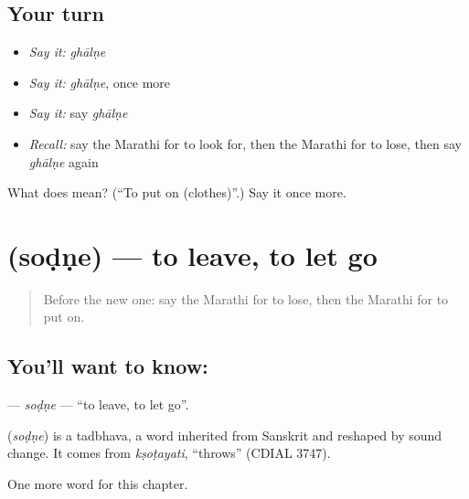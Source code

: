 \subsection*{Your turn}
\begin{itemize}
\raggedright
  \item \emph{Say it:} \emph{ghālṇe}
  \item \emph{Say it:} \emph{ghālṇe}, once more
  \item \emph{Say it:} say \emph{ghālṇe}
  \item \emph{Recall:} say the Marathi for to look for, then the Marathi for to lose, then say \emph{ghālṇe} again
\end{itemize}

\begin{tcolorbox}[breakable,colback=teal!4,colframe=teal!35!black,title={Before you move on}]
What does  mean? (\textquotedblleft{}To put on (clothes)\textquotedblright{}.) Say it once more.
\end{tcolorbox}
\section[\texorpdfstring{\mr{सोडणे} (soḍṇe)}{सोडणे (soḍṇe)}]{ (soḍṇe) — to leave, to let go}

\label{lesson:MR-C81-sodne}



\begin{quote}
Before the new one: say the Marathi for to lose, then the Marathi for to put on.
\end{quote}

\subsection*{You'll want to know: }
\textbf{} — \emph{soḍṇe} — \textquotedblleft{}to leave, to let go\textquotedblright{}.

\begin{cousinweb}
\textbf{} (\emph{soḍṇe}) is a tadbhava, a word inherited from Sanskrit and reshaped by sound change. It comes from \emph{kṣoṭayati}, \textquotedblleft{}throws\textquotedblright{} (CDIAL 3747).
\end{cousinweb}

\begin{grammarlens}[title={What you've built}]
One more word for this chapter.
\end{grammarlens}

